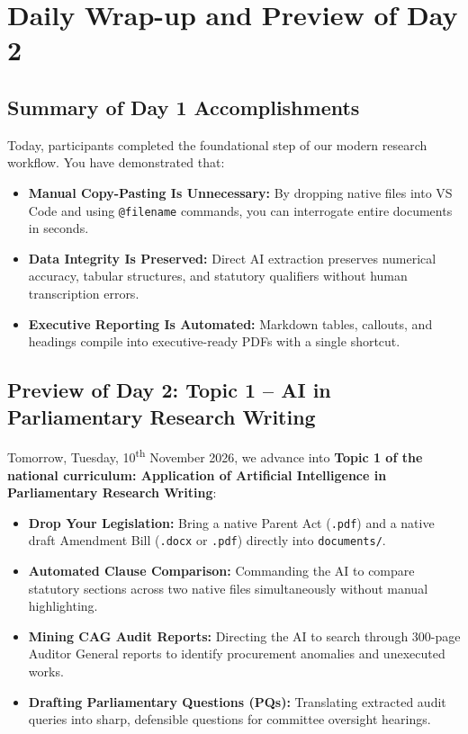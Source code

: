 \documentclass[11pt, a4paper]{report}
\begin{document}
\newpage

\chapter{Daily Wrap-up and Preview of Day 2}

\section{Summary of Day 1 Accomplishments}
Today, participants completed the foundational step of our modern research workflow. You have demonstrated that:
\begin{itemize}[label=-]
    \item \textbf{Manual Copy-Pasting Is Unnecessary:} By dropping native files into VS Code and using \texttt{@filename} commands, you can interrogate entire documents in seconds.
    \item \textbf{Data Integrity Is Preserved:} Direct AI extraction preserves numerical accuracy, tabular structures, and statutory qualifiers without human transcription errors.
    \item \textbf{Executive Reporting Is Automated:} Markdown tables, callouts, and headings compile into executive-ready PDFs with a single shortcut.
\end{itemize}

\section{Preview of Day 2: Topic 1 -- AI in Parliamentary Research Writing}
Tomorrow, Tuesday, 10\textsuperscript{th} November 2026, we advance into \textbf{Topic 1 of the national curriculum: Application of Artificial Intelligence in Parliamentary Research Writing}:
\begin{itemize}[label=-]
    \item \textbf{Drop Your Legislation:} Bring a native Parent Act (\texttt{.pdf}) and a native draft Amendment Bill (\texttt{.docx} or \texttt{.pdf}) directly into \texttt{documents/}.
    \item \textbf{Automated Clause Comparison:} Commanding the AI to compare statutory sections across two native files simultaneously without manual highlighting.
    \item \textbf{Mining CAG Audit Reports:} Directing the AI to search through 300-page Auditor General reports to identify procurement anomalies and unexecuted works.
    \item \textbf{Drafting Parliamentary Questions (PQs):} Translating extracted audit queries into sharp, defensible questions for committee oversight hearings.
\end{itemize}
\end{document}
